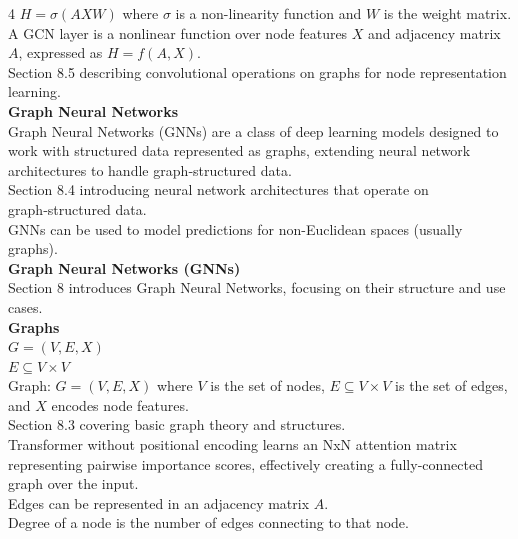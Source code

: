 \documentclass[8pt]{extarticle}
\begin{document}
\begin{multicols}{4}
$ H = \sigma(AXW) $ where $\sigma$ is a non-linearity function and $W$ is the weight matrix.\\
A GCN layer is a nonlinear function over node features $X$ and adjacency matrix $A$, expressed as $H = f(A, X)$.\\
Section 8.5 describing convolutional operations on graphs for node representation learning.\\
\vspace{2pt}\textbf{Graph Neural Networks}\\
Graph Neural Networks (GNNs) are a class of deep learning models designed to work with structured data represented as graphs, extending neural network architectures to handle graph‑structured data.\\
Section 8.4 introducing neural network architectures that operate on graph‑structured data.\\
GNNs can be used to model predictions for non-Euclidean spaces (usually graphs).\\
\vspace{2pt}\textbf{Graph Neural Networks (GNNs)}\\
Section 8 introduces Graph Neural Networks, focusing on their structure and use cases.\\
\vspace{2pt}\textbf{Graphs}\\
$ G = (V, E, X) $\\
$ E \subseteq V \times V $\\
Graph: $G = (V, E, X)$ where $V$ is the set of nodes, $E \subseteq V \times V$ is the set of edges, and $X$ encodes node features.\\
Section 8.3 covering basic graph theory and structures.\\
Transformer without positional encoding learns an NxN attention matrix representing pairwise importance scores, effectively creating a fully‑connected graph over the input.\\
Edges can be represented in an adjacency matrix $A$.\\
Degree of a node is the number of edges connecting to that node.\\


\end{multicols}
\end{document}
